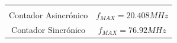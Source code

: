 \begin{table}[H]
    \centering
    \begin{tabular}{c c}
        \hline \\
        Contador Asincr\'onico & $f_{MAX} = 20.408MHz$ \\
        Contador Sincr\'onico & $f_{MAX} = 76.92MHz$ \\
        \hline
    \end{tabular}
\end{table}
